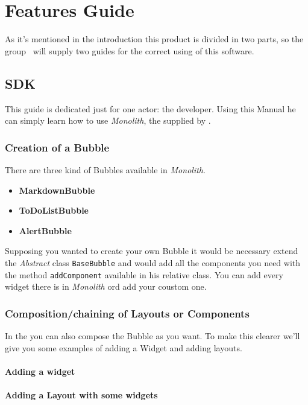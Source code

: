\section{Features Guide}
As it's mentioned in the introduction this product is divided in two parts, so the group \gruppo\ will supply two guides for the correct using of this software.

\subsection{SDK}
This guide is dedicated just for one actor: the developer. Using this Manual he can simply learn how to use \textit{Monolith}, the  supplied by \gruppo. 

\subsubsection{Creation of a Bubble}
There are three kind of Bubbles available in \textit{Monolith}.
\begin{itemize}
\item \textbf{MarkdownBubble}
\item \textbf{ToDoListBubble}
\item \textbf{AlertBubble}
\end{itemize}


Supposing you wanted to create your own Bubble it would be necessary extend the \textit{Abstract} class \texttt{BaseBubble} and would add all the components you need with the method \texttt{addComponent} available in his relative class. You can add every widget there is in \textit{Monolith} ord add your coustom one.




\subsubsection{Composition/chaining of Layouts or Components}

In the  you can also compose the Bubble as you want. To make this clearer we'll give you some examples of adding a Widget and adding layouts.

\paragraph{Adding a widget}


\paragraph{Adding a Layout with some widgets}

